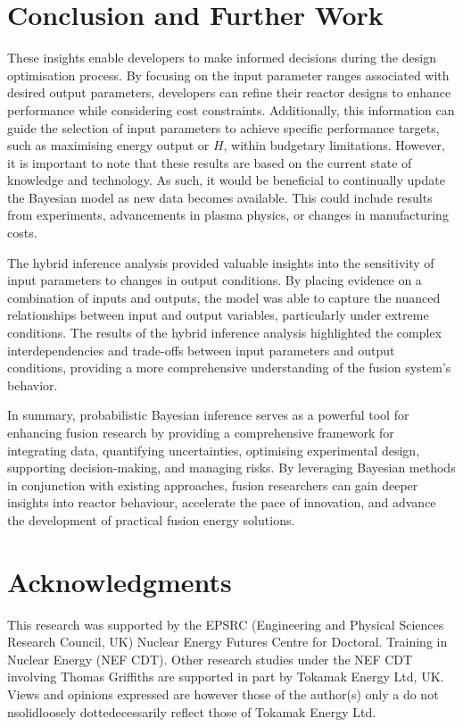\documentclass[journal]{IEEEtran}
\begin{document}
\section{Conclusion and Further Work}\label{sec:conc}
These insights enable developers to make informed decisions during the design optimisation process. By focusing on the input parameter ranges associated with desired output parameters, developers can refine their reactor designs to enhance performance while considering cost constraints. Additionally, this information can guide the selection of input parameters to achieve specific performance targets, such as maximising energy output or $H$, within budgetary limitations. However, it is important to note that these results are based on the current state of knowledge and technology. As such, it would be beneficial to continually update the Bayesian model as new data becomes available. This could include results from experiments, advancements in plasma physics, or changes in manufacturing costs.

The hybrid inference analysis provided valuable insights into the sensitivity of input parameters to changes in output conditions. By placing evidence on a combination of inputs and outputs, the model was able to capture the nuanced relationships between input and output variables, particularly under extreme conditions. The results of the hybrid inference analysis highlighted the complex interdependencies and trade-offs between input parameters and output conditions, providing a more comprehensive understanding of the fusion system's behavior.

In summary, probabilistic Bayesian inference serves as a powerful tool for enhancing fusion research by providing a comprehensive framework for integrating data, quantifying uncertainties, optimising experimental design, supporting decision-making, and managing risks. By leveraging Bayesian methods in conjunction with existing approaches, fusion researchers can gain deeper insights into reactor behaviour, accelerate the pace of innovation, and advance the development of practical fusion energy solutions.

\section{Acknowledgments}
This research was supported by the EPSRC (Engineering and Physical Sciences Research Council, UK) Nuclear Energy Futures Centre for Doctoral. Training in Nuclear Energy (NEF CDT). Other research studies under the NEF CDT involving Thomas Griffiths are supported in part by Tokamak Energy Ltd, UK. Views and opinions expressed are however those of the author(s) only a do not nsolidloosely dottedecessarily reflect those of Tokamak Energy Ltd.





\begin{appendices}
    
 \end{appendices}
\end{document}
